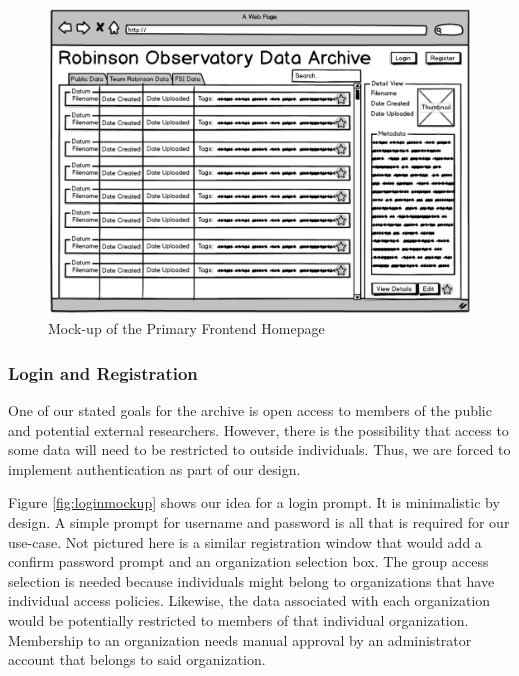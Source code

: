 \documentclass[12pt]{article}
\begin{document}
\begin{figure}[h]
	\centering
	\includegraphics[width=\linewidth]{frontend_mockup}
	\caption{Mock-up of the Primary Frontend Homepage}
	\label{fig:frontendmockup}
\end{figure}

\subsubsection{Login and Registration}

One of our stated goals for the archive is open access to members of the public and potential external researchers. However, there is the possibility that access to some data will need to be restricted to outside individuals. Thus, we are forced to implement authentication as part of our design.

Figure \ref{fig:loginmockup} shows our idea for a login prompt. It is minimalistic by design. A simple prompt for username and password is all that is required for our use-case. Not pictured here is a similar registration window that would add a confirm password prompt and an organization selection box. The group access selection is needed because individuals might belong to organizations that have individual access policies. Likewise, the data associated with each organization would be potentially restricted to members of that individual organization. Membership to an organization needs manual approval by an administrator account that belongs to said organization.
\end{document}
